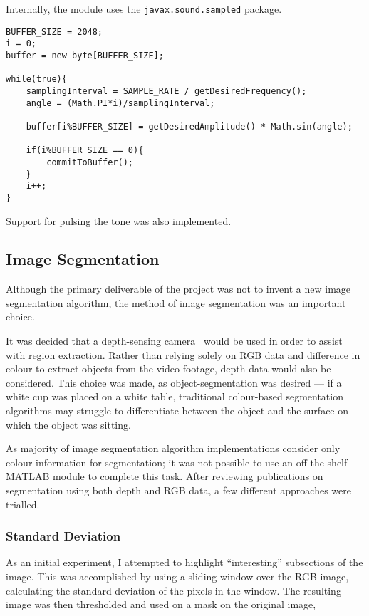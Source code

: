 Internally, the module uses the \texttt{javax.sound.sampled} package. 

\begin{verbatim}
BUFFER_SIZE = 2048;
i = 0;
buffer = new byte[BUFFER_SIZE];

while(true){
    samplingInterval = SAMPLE_RATE / getDesiredFrequency();
    angle = (Math.PI*i)/samplingInterval;

    buffer[i%BUFFER_SIZE] = getDesiredAmplitude() * Math.sin(angle);

    if(i%BUFFER_SIZE == 0){
        commitToBuffer();
    }
    i++;
}
\end{verbatim}

Support for pulsing the tone was also implemented. 

\subsection{Image Segmentation}
Although the primary deliverable of the project was not to invent a new image segmentation algorithm, the method of image segmentation was an important choice.

It was decided that a depth-sensing camera~\cite{xtion} would be used in order to assist with region extraction. Rather than relying solely on RGB data and difference in colour to extract objects from the video footage, depth data would also be considered. This choice was made, as object-segmentation was desired --- if a white cup was placed on a white table, traditional colour-based segmentation algorithms may struggle to differentiate between the object and the surface on which the object was sitting.

As majority of image segmentation algorithm implementations consider only colour information for segmentation; it was not possible to use an off-the-shelf MATLAB module to complete this task. After reviewing publications on segmentation using both depth and RGB data, a few different approaches were trialled.

\subsubsection{Standard Deviation}
As an initial experiment, I attempted to highlight ``interesting'' subsections of the image. This was accomplished by using a sliding window over the RGB image, calculating the standard deviation of the pixels in the window. The resulting image was then thresholded and used on a mask on the original image,

